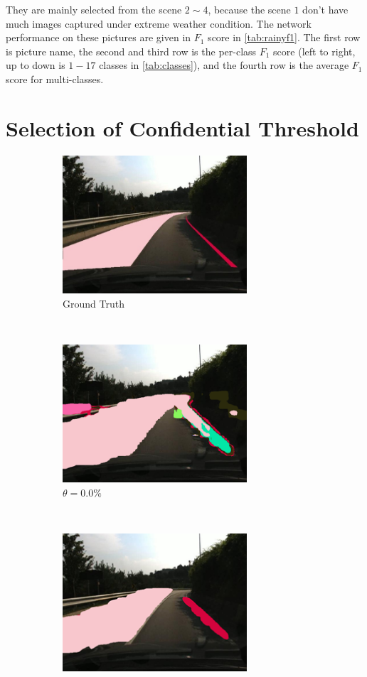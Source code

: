 \begin{spacing}{1.5}
They are mainly selected from the scene $2 \sim 4$, because the scene $1$ don't have much images captured under extreme weather condition. The network performance on these pictures are given in $F_1$ score in \autoref{tab:rainyf1}. The first row is picture name, the second and third row is the per-class $F_1$ score (left to right, up to down is $1-17$ classes in \autoref{tab:classes}), and the fourth row is the average $F_1$ score for multi-classes.


\section{Selection of Confidential Threshold}
\label{sec:EX_threshold}

\begin{figure}[!ht]
    \centering
    \begin{subfigure}[b]{0.49\textwidth}
        \centering
        \includegraphics[width=2.7in, fbox]{Chapter5/Picture3an.jpg}
        \caption{Ground Truth}
    \end{subfigure}%
    ~
    \begin{subfigure}[b]{0.49\textwidth}
        \centering
        \includegraphics[width=2.7in, fbox]{Chapter5/pic1conf0.png}
        \caption{$\theta = 0.0\%$}
    \end{subfigure}
    \\
    \begin{subfigure}[b]{0.49\textwidth}
        \centering
        \includegraphics[width=2.7in, fbox]{Chapter5/pic1conf31.png}

\end{subfigure}
\end{figure}
\end{spacing}
